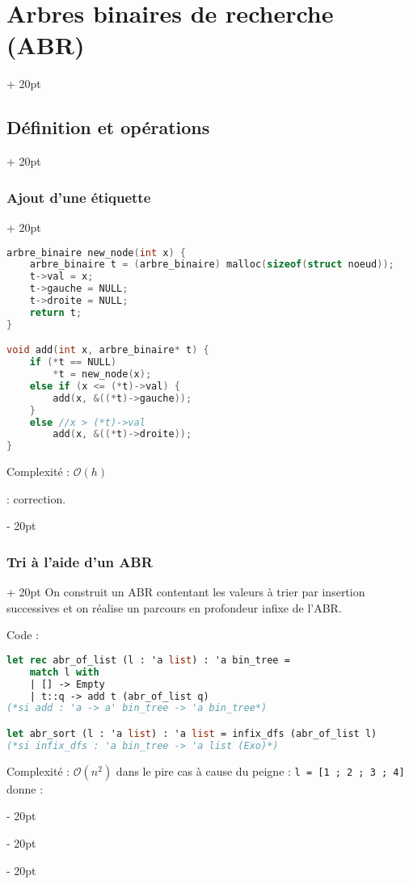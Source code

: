 \documentclass[a4paper, 12pt, twoside]{article}
\newcommand{\ind}[1][20pt]{\advance\leftskip + #1}
\newcommand{\deind}[1][20pt]{\advance\leftskip - #1}
\newenvironment{indt}[2][20pt]{#2 \par \ind[#1]}{\par \deind} %
\begin{document}
\begin{indt}{\section{Arbres binaires de recherche (ABR)}}
\begin{indt}{\subsection{Définition et opérations}}
\begin{indt}{\subsubsection{Ajout d'une étiquette}}
                \begin{lstlisting}[language=C, xleftmargin=80pt]
arbre_binaire new_node(int x) {
    arbre_binaire t = (arbre_binaire) malloc(sizeof(struct noeud));
    t->val = x;
    t->gauche = NULL;
    t->droite = NULL;
    return t;
}

void add(int x, arbre_binaire* t) {
    if (*t == NULL)
        *t = new_node(x);
    else if (x <= (*t)->val) {
        add(x, &((*t)->gauche));
    }
    else //x > (*t)->val
        add(x, &((*t)->droite));
}\end{lstlisting}
                
                Complexité : $\mathcal O(h)$
                
                 : correction.
            \end{indt}
            
            \vspace{12pt}
            
            \begin{indt}{\subsubsection{Tri à l'aide d'un ABR}}
                On construit un ABR contentant les valeurs à trier par insertion successives et on réalise un parcours en profondeur infixe de l'ABR.
                
                Code :
                
                \begin{lstlisting}[language=Caml, xleftmargin=80pt]
let rec abr_of_list (l : 'a list) : 'a bin_tree =
    match l with
    | [] -> Empty
    | t::q -> add t (abr_of_list q)
(*si add : 'a -> a' bin_tree -> 'a bin_tree*)

let abr_sort (l : 'a list) : 'a list = infix_dfs (abr_of_list l)
(*si infix_dfs : 'a bin_tree -> 'a list (Exo)*)\end{lstlisting}
                
                Complexité : $\mathcal O(n^2)$ dans le pire cas à cause du peigne :
                \texttt{l = [1 ; 2 ; 3 ; 4]}
                donne :
                
                \begin{center}
                \end{center}
                

\end{indt}
\end{indt}
\end{indt}
\end{document}
